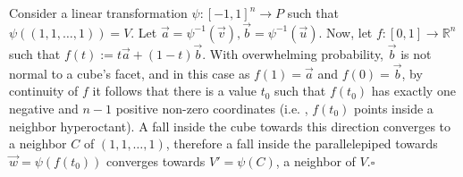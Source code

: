 \documentclass[11pt]{article}
\theoremstyle{plain}
\newtheorem{THE}{Theorem}[section]
\theoremstyle{definition}
\theoremstyle{remark}
\newcommand{\RR}{\mathbb{R}}      %
\newcommand{\ZZ}{\mathbb{Z}}      %
\newcommand{\ee}{\mathbf{e}}
\newcommand{\ie}{i.e.$\!$ }
\newcommand{\bra}{\langle}
\newcommand{\ket}{\rangle}
\begin{document}
%
%
%


 Consider a linear transformation $\psi:[-1,1]^n\to P$ such that $\psi((1,1,\dots,1))=V$. Let $\vec a=\psi^{-1}(\vec v),\vec b=\psi^{-1}(\vec u)$. Now, let $f:[0,1]\to \RR^n$ such that $f(t):=t\vec a+(1-t)\vec b$. With overwhelming probability, $\vec b$ is not normal to a cube's facet, and in this case as $f(1)=\vec a$ and $f(0)=\vec b$, by continuity of $f$ it follows that there is a value $t_0$ such that $f(t_0)$ has exactly one negative and $n-1$ positive non-zero coordinates (\ie, $f(t_0)$ points inside a neighbor hyperoctant). A fall inside the cube towards this direction converges to a neighbor $C$ of $(1,1,\dots,1)$, therefore a fall inside the parallelepiped towards $\vec w=\psi(f(t_0))$ converges towards $V'=\psi(C)$, a neighbor of $V$.\hfill$\square$
\medskip
\medskip
\medskip
\end{document}
